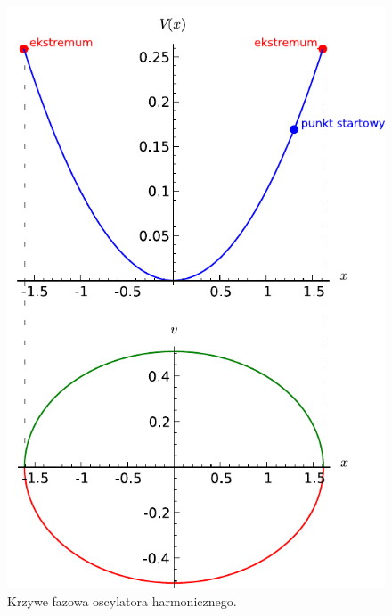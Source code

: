 \documentclass[a4paper,12pt,polish]{sphinxmanual}
\begin{document}
\begin{figure}[htbp]
\centering
\capstart

\includegraphics{sage_chI022_02.pdf}
\caption{Krzywe fazowa oscylatora harmonicznego.}\end{figure}
\end{document}
